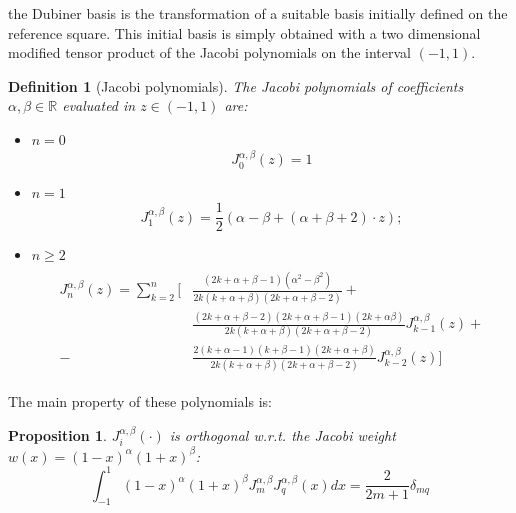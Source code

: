 \documentclass[a4paper,11pt]{article}
\newtheorem{definition}{Definition}
\newtheorem{prop}{Proposition}
\begin{document}
    \noindent the Dubiner basis is the transformation of a suitable basis initially defined on the reference square. This initial basis is simply obtained with a two dimensional modified tensor product of the Jacobi polynomials on the interval $(-1,1)$.
    \newpage
    \begin{definition}[Jacobi polynomials]
    The Jacobi polynomials of coefficients $\alpha,\beta \in \mathbb{R}$ evaluated in $z\in (-1,1)$ are:
    \begin{itemize}[label=\textendash]
    \item $n=0$
    \begin{equation}
    J_0^{\alpha,\beta}(z)=1
    \end{equation}
    \item $n=1$
    \begin{equation}
    J_1^{\alpha,\beta}(z)=\frac{1}{2}(\alpha-\beta+(\alpha+\beta+2)\cdot z);
    \end{equation}
    \item $n\ge2$
    \newline
    \begin{equation}
    \begin{gathered}
    \begin{aligned}
    J_n^{\alpha,\beta}(z)=\sum_{k=2}^{n} \Big[&\frac{(2k+\alpha+\beta-1)(\alpha^{2}-\beta^{2})}{2k(k+\alpha+\beta)(2k+\alpha+\beta-2)}+ \\ &\frac{(2k+\alpha+\beta-2)(2k+\alpha+\beta-1)(2k+\alpha \beta)}{2k(k+\alpha+\beta)(2k+\alpha+\beta-2)} J_{k-1}^{\alpha,\beta}(z) +
    \\-&\frac{2(k+\alpha-1)(k+\beta-1)(2k+\alpha+\beta)}{2k(k+\alpha+\beta)(2k+\alpha+\beta-2)} J_{k-2}^{\alpha,\beta}(z) \Big]
    \end{aligned}
    \end{gathered}
    \end{equation}
    \end{itemize}
    \end{definition}
    \vspace{5mm}
    \noindent The main property of these polynomials is:
    \begin{prop}
    $J_i^{\alpha,\beta}(\cdot)$ is orthogonal w.r.t. the Jacobi weight $w(x)=(1-x)^\alpha(1+x)^\beta$:
    \begin{equation}
    \int_{-1}^{1}{(1-x)^\alpha(1+x)^\beta J_m^{\alpha,\beta} J_q^{\alpha,\beta}(x)dx}=\frac{2}{2m+1} \delta_{mq} 
    \end{equation}
    \end{prop}
    
\end{document}

